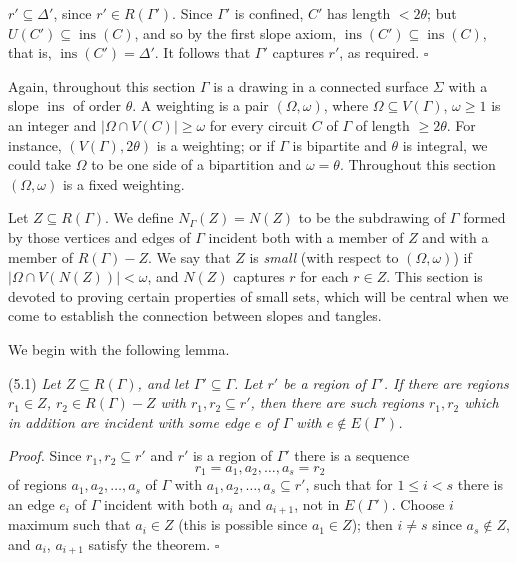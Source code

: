 \noindent $r' \subseteq \Delta'$, since $r' \in R(\Gamma')$. Since $\Gamma'$ is confined, $C'$ has length $< 2\theta$; but $U(C') \subseteq \operatorname{ins}(C)$, and so by the first slope axiom, $\operatorname{ins}(C') \subseteq \operatorname{ins}(C)$, that is, $\operatorname{ins}(C') = \Delta'$. It follows that $\Gamma'$ captures $r'$, as required. $\square$


Again, throughout this section $\Gamma$ is a drawing in a connected surface $\Sigma$ with a slope $\operatorname{ins}$ of order $\theta$. A weighting is a pair $(\Omega, \omega)$, where $\Omega \subseteq V(\Gamma)$, $\omega \ge 1$ is an integer and $|\Omega \cap V(C)| \ge \omega$ for every circuit $C$ of $\Gamma$ of length $\ge 2\theta$. For instance, $(V(\Gamma), 2\theta)$ is a weighting; or if $\Gamma$ is bipartite and $\theta$ is integral, we could take $\Omega$ to be one side of a bipartition and $\omega = \theta$. Throughout this section $(\Omega, \omega)$ is a fixed weighting.

Let $Z \subseteq R(\Gamma)$. We define $N_\Gamma(Z) = N(Z)$ to be the subdrawing of $\Gamma$ formed by those vertices and edges of $\Gamma$ incident both with a member of $Z$ and with a member of $R(\Gamma) - Z$. We say that $Z$ is \textit{small} (with respect to $(\Omega, \omega)$) if $|\Omega \cap V(N(Z))| < \omega$, and $N(Z)$ captures $r$ for each $r \in Z$. This section is devoted to proving certain properties of small sets, which will be central when we come to establish the connection between slopes and tangles.

We begin with the following lemma.

\stmt
(5.1) \textit{Let $Z \subseteq R(\Gamma)$, and let $\Gamma' \subseteq \Gamma$. Let $r'$ be a region of $\Gamma'$. If there are regions $r_1 \in Z$, $r_2 \in R(\Gamma) - Z$ with $r_1, r_2 \subseteq r'$, then there are such regions $r_1, r_2$ which in addition are incident with some edge $e$ of $\Gamma$ with $e \notin E(\Gamma')$.}

\textit{Proof.} Since $r_1, r_2 \subseteq r'$ and $r'$ is a region of $\Gamma'$ there is a sequence
\begin{equation*}
r_1 = a_1, a_2, \dots, a_s = r_2
\end{equation*}
of regions $a_1, a_2, \dots, a_s$ of $\Gamma$ with $a_1, a_2, \dots, a_s \subseteq r'$, such that for $1 \le i < s$ there is an edge $e_i$ of $\Gamma$ incident with both $a_i$ and $a_{i+1}$, not in $E(\Gamma')$. Choose $i$ maximum such that $a_i \in Z$ (this is possible since $a_1 \in Z$); then $i \ne s$ since $a_s \notin Z$, and $a_i$, $a_{i+1}$ satisfy the theorem. $\square$

